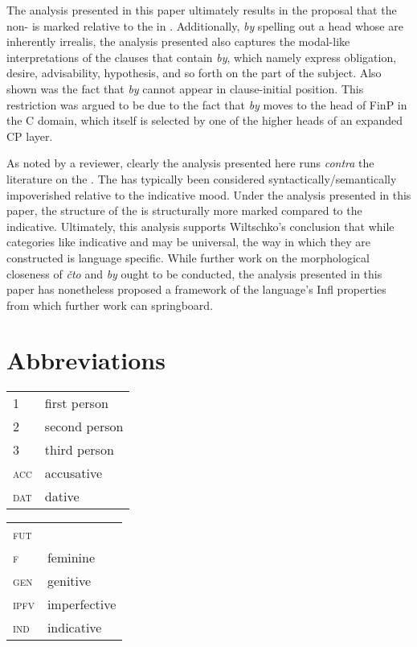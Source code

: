 \documentclass[output=paper,modfonts,newtxmath,hidelinks,]{langscibook}
\begin{document}
The analysis presented in this paper ultimately results in the proposal that the non- is marked relative to the  in . Additionally, \textit{by} spelling out a head whose  are inherently irrealis, the analysis presented also captures the modal-like interpretations of the  clauses that contain \textit{by}, which namely express obligation, desire, advisability, hypothesis, and so forth on the part of the subject. Also shown was the fact that \textit{by} cannot appear in clause-initial position. This restriction was argued to be due to the fact that \textit{by} moves to the head of FinP in the C domain, which itself is selected by one of the higher heads of an expanded CP layer. 

As noted by a reviewer, clearly the analysis presented here runs \textit{contra} the literature on the . The  has typically been considered syntactically/semantically impoverished relative to the indicative mood. Under the analysis presented in this paper, the structure of the   is structurally more marked compared to the indicative. Ultimately, this analysis supports Wiltschko’s conclusion that while categories like indicative and  may be universal, the way in which they are constructed is language specific. While further work on the morphological closeness of \textit{čto} and \textit{by} ought to be conducted, the analysis presented in this paper has nonetheless proposed a framework of the language’s Infl properties from which further work can springboard.




\section*{Abbreviations}


\begin{tabularx}{.5\textwidth}{@{}lQ@{}}
\textsc{1}&first person\\
\textsc{2}&second person\\
\textsc{3}&third person\\
\textsc{acc}&{accusative}\\
\textsc{dat}&{dative}\\
\end{tabularx}%
\begin{tabularx}{.5\textwidth}{@{}lQ@{}}
\textsc{fut}&\\
\textsc{f}&{feminine}\\
\textsc{gen}&{genitive}\\
\textsc{ipfv}&{imperfective}\\
\textsc{ind}&indicative\\
\end{tabularx}%
\end{document}
